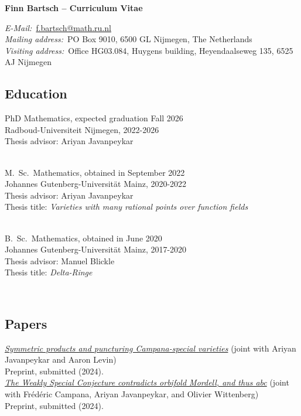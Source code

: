 \documentclass[paper=a4,fontsize=11pt,DIV=11,BCOR=3mm,pdftex]{scrartcl}
\begin{document}
\thispagestyle{empty}
{
\centering
\Large \textbf{Finn Bartsch -- Curriculum Vitae} \par
}
\bigskip \par
\textit{E-Mail:}~\href{mailto:f.bartsch@math.ru.nl}{f.bartsch@math.ru.nl} \\
\textit{Mailing address:}~PO Box 9010, 6500 GL Nijmegen, The Netherlands \\
\textit{Visiting address:}~Office HG03.084, Huygens building, Heyendaalseweg 135, 6525 AJ Nijmegen \\
\par

\subsection*{Education}
PhD Mathematics, expected graduation Fall 2026 \\
Radboud-Universiteit Nijmegen, 2022-2026 \\
Thesis advisor: Ariyan Javanpeykar \\
~\par

M.~Sc.~Mathematics, obtained in September 2022 \\
Johannes Gutenberg-Universität Mainz, 2020-2022 \\
Thesis advisor: Ariyan Javanpeykar \\
Thesis title: \textit{Varieties with many rational points over function fields} \\
~\par

B.~Sc.~Mathematics, obtained in June 2020 \\
Johannes Gutenberg-Universität Mainz, 2017-2020 \\
Thesis advisor: Manuel Blickle \\
Thesis title: \textit{Delta-Ringe}

~\par


\subsection*{Papers}

\href{https://arxiv.org/abs/2412.14931}{\textit{Symmetric products and puncturing Campana-special varieties}} (joint with Ariyan Javanpeykar and Aaron Levin) \\
Preprint, submitted (2024). \\

\href{https://arxiv.org/abs/2410.06643}{\textit{The Weakly Special Conjecture contradicts orbifold Mordell, and thus abc}} (joint with Frédéric Campana, Ariyan Javanpeykar, and Olivier Wittenberg) \\
Preprint, submitted (2024). \\
\end{document}
